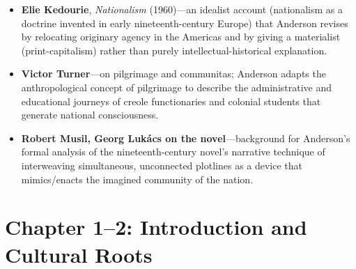 \documentclass[12pt]{article}
\begin{document}
\begin{itemize}[leftmargin=*, itemsep=4pt]
    \item \textbf{Elie Kedourie}, \textit{Nationalism} (1960)---an idealist account (nationalism as a doctrine invented in early nineteenth-century Europe) that Anderson revises by relocating originary agency in the Americas and by giving a materialist (print-capitalism) rather than purely intellectual-historical explanation.
    \item \textbf{Victor Turner}---on pilgrimage and communitas; Anderson adapts the anthropological concept of pilgrimage to describe the administrative and educational journeys of creole functionaries and colonial students that generate national consciousness.
    \item \textbf{Robert Musil, Georg Lukács on the novel}---background for Anderson's formal analysis of the nineteenth-century novel's narrative technique of interweaving simultaneous, unconnected plotlines as a device that mimics/enacts the imagined community of the nation.
\end{itemize}

\section{Chapter 1--2: Introduction and Cultural Roots}
\end{document}

